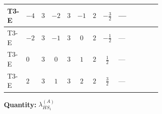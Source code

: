 \documentclass[8pt]{article}
\begin{document}
\begin{landscape}
\begin{longtable}{@{}llcccccc >{\raggedright\arraybackslash}p{0.21\linewidth} >{\raggedright\arraybackslash}p{0.21\linewidth} >{\raggedright\arraybackslash}p{0.21\linewidth}@{}}
\midrule
T3-E & $-4$ & $3$ & $-2$ & $3$ & $-1$ & $2$ & $-\frac{3}{2}$ & --- & \scriptsize\adjustbox{max width=\linewidth}{$\begin{gathered} -\frac{4}{3} \operatorname{Tr}\!\left({y_1}\,\left({y_1}\right)^{\dagger}\,{Y_e}\,\left({Y_e}\right)^{\dagger}\right)\end{gathered}$} & \scriptsize\adjustbox{max width=\linewidth}{$\begin{gathered} -\frac{4}{3} {\lambda_5} \left({\lambda_5}\right)^{*}\end{gathered}$} \\
\midrule
T3-E & $-2$ & $3$ & $-1$ & $3$ & $0$ & $2$ & $-\frac{1}{2}$ & --- & \scriptsize\adjustbox{max width=\linewidth}{$\begin{gathered} -\frac{4}{3} \operatorname{Tr}\!\left({y_1}\,\left({y_1}\right)^{\dagger}\,{Y_e}\,\left({Y_e}\right)^{\dagger}\right)\end{gathered}$} & \scriptsize\adjustbox{max width=\linewidth}{$\begin{gathered} -\frac{4}{3} {\lambda_5} \left({\lambda_5}\right)^{*}\end{gathered}$} \\
\midrule
T3-E & $0$ & $3$ & $0$ & $3$ & $1$ & $2$ & $\frac{1}{2}$ & --- & \scriptsize\adjustbox{max width=\linewidth}{$\begin{gathered} -\frac{4}{3} \operatorname{Tr}\!\left({y_1}\,\left({y_1}\right)^{\dagger}\,{Y_e}\,\left({Y_e}\right)^{\dagger}\right)\end{gathered}$} & \scriptsize\adjustbox{max width=\linewidth}{$\begin{gathered} -\frac{4}{3} {\lambda_5} \left({\lambda_5}\right)^{*}\end{gathered}$} \\
\midrule
T3-E & $2$ & $3$ & $1$ & $3$ & $2$ & $2$ & $\frac{3}{2}$ & --- & \scriptsize\adjustbox{max width=\linewidth}{$\begin{gathered} -\frac{4}{3} \operatorname{Tr}\!\left({y_1}\,\left({y_1}\right)^{\dagger}\,{Y_e}\,\left({Y_e}\right)^{\dagger}\right)\end{gathered}$} & \scriptsize\adjustbox{max width=\linewidth}{$\begin{gathered} -\frac{4}{3} {\lambda_5} \left({\lambda_5}\right)^{*}\end{gathered}$} \\
\midrule
\bottomrule
\end{longtable}
\clearpage
\noindent\textbf{Quantity: }$\lambda_{HS_1}^{(A)}$\par\smallskip

\end{landscape}
\end{document}
